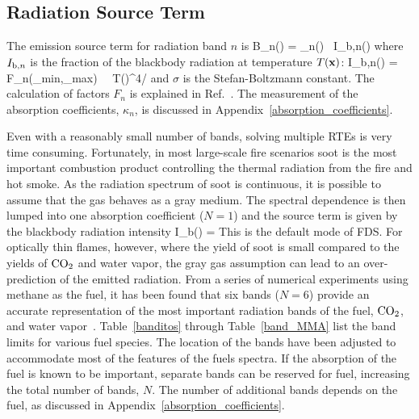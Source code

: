 \subsection{Radiation Source Term}

The emission source term for radiation band $n$ is
\be
   B_n(\bx) = \kappa_n(\bx) \, I_{{\rm b},n}(\bx)
\ee
where $I_{{\rm b},n}$ is the fraction of the blackbody radiation at temperature $T({\mathbf{x}})$:
\be
   I_{{\rm b},n}(\bx) = F_n(\la_{\rm min},\la_{\rm max}) \, \sigma \, T(\bx)^4/\pi
\ee
and $\sigma$ is the Stefan-Boltzmann constant. The calculation of factors $F_n$ is explained in Ref.~\cite{Siegel:1}. The measurement of the absorption coefficients, $\kappa_n$, is discussed in Appendix~\ref{absorption_coefficients}.

Even with a reasonably small number of bands, solving multiple RTEs is very time consuming. Fortunately, in most large-scale fire scenarios soot is the most important combustion product controlling the thermal radiation from the fire and hot smoke. As the radiation spectrum of soot is continuous, it is possible to assume that the gas behaves as a gray medium.  The spectral dependence is then lumped into one absorption coefficient ($N=1$) and the source term is given by the blackbody radiation intensity
\be
   I_{\rm b}(\bx) =  \label{emission_source_term}
\ee
This is the default mode of FDS. For optically thin flames, however, where the yield of soot is small compared to the yields of $\rm CO_2$ and water vapor, the gray gas assumption can lead to an over-prediction of the emitted radiation. From a series of numerical experiments using methane as the fuel, it has been found that six bands ($N=6$) provide an accurate representation of the most important radiation bands of the fuel, $\rm CO_2$, and water vapor~\cite{Hostikka:3}. Table~\ref{banditos} through Table~\ref{band_MMA} list the band limits for various fuel species. The location of the bands have been adjusted to accommodate most of the features of the fuels spectra. If the absorption of the fuel is known to be important, separate bands can be reserved for fuel, increasing the total number of bands, $N$. The number of additional bands depends on the fuel, as discussed in Appendix~\ref{absorption_coefficients}.

